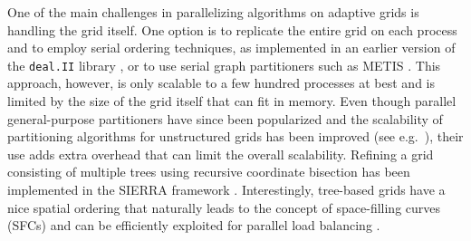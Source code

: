 One of the main challenges in parallelizing algorithms on adaptive grids is
handling the grid itself.
One option is to replicate the entire grid on each process and to employ serial
ordering techniques, as implemented in an earlier version of the \texttt{deal.II} library
\cite{Bangerth;Hartmann;Kanschat:07:deal.II----a-General}, or to use serial
graph partitioners such as METIS \cite{KarypisKumar95}.
%
%
This approach, however, is only scalable to a few hundred processes at best and
is limited by the size of the grid itself that can fit in memory.
Even though parallel general-purpose partitioners have since been popularized
\cite{Karypis;Kumar:98:A-parallel-algorithm,
Boman;Catalyurek;Chevalier;etal:12:The-Zoltan-and-Isorr} and
the scalability of partitioning algorithms for unstructured grids
has been improved (see e.g.\ \cite{SahniZhouShephardEtAl09}),
their use
adds extra overhead that can limit the overall scalability.
Refining a grid consisting of multiple trees using recursive coordinate
bisection has been implemented in the SIERRA framework \cite{StewartEdwards04}.
Interestingly, tree-based grids have a nice spatial ordering that naturally
leads to the concept of space-filling curves (SFCs) and can be efficiently
exploited for parallel load balancing
\cite{Aluru;Sevilgen:97:Parallel-domain-deco, GriebelZumbusch99,
      Campbell;Devine;Flaherty;etal:03:Dynamic-octree-load-}.

